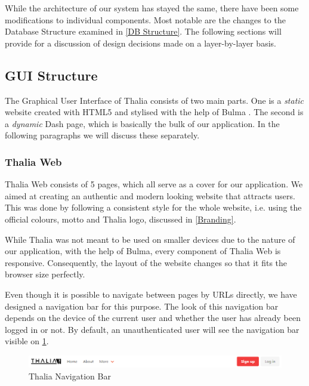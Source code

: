 \documentclass[main.tex]{subfiles}
\begin{document}
While the architecture of our system has stayed the same, there have been some modifications to individual components. Most notable are the changes to the Database Structure examined in \ref{DB Structure}. The following sections will provide for a discussion of design decisions made on a layer-by-layer basis.

\subsection{GUI Structure}

The Graphical User Interface of Thalia consists of two main parts. One is a \emph{static} website created with HTML5 \cite{html5} and stylised with the help of Bulma \cite{bulma}. The second is a \emph{dynamic} Dash \cite{dash} page, which is basically the bulk of our application. In the following paragraphs we will discuss these separately. 

\subsubsection{Thalia Web}

Thalia Web consists of 5 pages, which all serve as a cover for our application. We aimed at creating an authentic and modern looking website that attracts users. This was done by following a consistent style for the whole website, i.e. using the official colours, motto and Thalia logo, discussed in \ref{Branding}.

While Thalia was not meant to be used on smaller devices due to the nature of our application, with the help of Bulma, every component of Thalia Web is responsive. Consequently, the layout of the website changes so that it fits the browser size perfectly.

Even though it is possible to navigate between pages by URLs directly, we have designed a navigation bar for this purpose. The look of this navigation bar depends on the device of the current user and whether the user has already been logged in or not. By default, an unauthenticated user will see the navigation bar visible on \figurename{\ref{thalia_navbar}}.

\begin{figure}[H]
   \centering
   \includegraphics[width=\textwidth]{08Appendices/081User/081Pictures/navbar.png}
   \caption{Thalia Navigation Bar}
   \label{thalia_navbar}
\end{figure}
\end{document}
